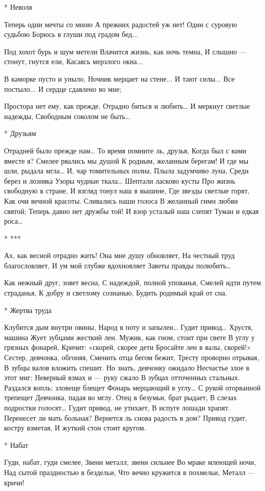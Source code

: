 * Неволя

Теперь одни мечты со мною
А прежних радостей уж нет!
Один с суровую судьбою
Борюсь в глуши под градом бед...

Под хохот бурь и шум метели
Влачится жизнь, как ночь темна,
И слышно — стонут, гнутся ели,
Касаясь мерзлого окна...

В каморке пусто и уныло,
Ночник мерцает на стене...
И тают силы... Все постыло...
И сердце сдавлено во мне;

Простора нет ему, как прежде,
Отрадно биться и любить…
И меркнут светлые надежды,
Свободным соколом не быть…


* Друзьям

Отрадней было прежде нам…
То время помните ль, друзья,
Когда был с вами вместе я?
Смелее рвались мы душой
К родным, желанным берегам!
И где мы шли, рыдала мгла…
И, чар томительных полна,
Плыла задумчиво луна,
Среди берез и лозняка
Узоры чудные ткала…
Шептали ласково кусты
Про жизнь свободную в стране,
И взгляд тонул наш в вышине,
Где звезды светлые горят,
Как очи вечной красоты.
Сливались наши голоса
В желанный гимн любви святой;
Теперь давно нет дружбы той!
И взор усталый наш слепят
Туман и едкая роса…


* ***

Ах, как весной отрадно жить!
Она мне душу обновляет,
На честный труд благословляет,
И ум мой глубже вдохновляет
Заветы правды полюбить…

Как нежный друг, зовет весна,
С надеждой, полной упованья,
Смелей идти путем страданья,
К добру и светлому сознанью,
Будить родимый край от сна.


* Жертва труда

Клубится дым внутри овины,
Народ в поту и запылен…
Гудит привод… Хрустя, машина
Жует зубцами жесткий лен.
Мужик, как гном, стоит при свете
В углу у грязных фонарей,
Кричит: «скорей, скорее дети
Бросайте лен в валы, скорей!»
Сестер, девчонка, обгоняя,
Сменить отца бегом бежит,
Тресту проворно отрывая,
В зубцы валов вложить спешит.
Но знать, девчонку ожидало
Несчастье злое в этот миг:
Неверный взмах и — руку сжало
В зубцах отточенных стальных.
Раздался вопль; зловеще блещет
Фонарь мерцающий в углу…
С рукой оторванной трепещет
Девчонка, падая во мглу.
Отец в безумьи, брат рыдает,
В слезах подростки голосят…
Гудит привод, не утихает,
В испуге лошади храпят.
Перенесет ли мать больная?
Вернется ль снова радость в дом?
Привод гудит, костру взметая,
И жуткий стон стоит кругом.


* Набат

Гуди, набат, гуди смелее,
Звени металл, звени сильнее
Во мраке млеющей ночи,
Над сытой праздностью в бездельи,
Что вечно кружится в похмельи,
Металл — кричи!

